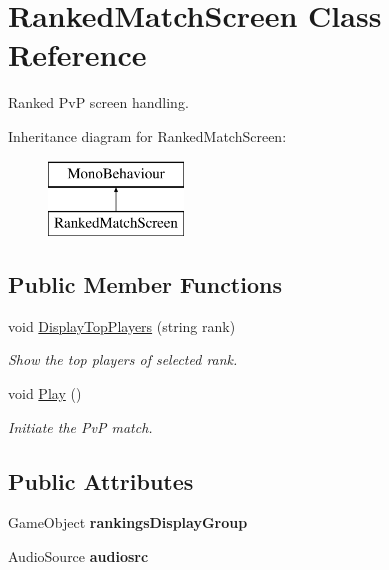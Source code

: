 \hypertarget{class_ranked_match_screen}{}\section{Ranked\+Match\+Screen Class Reference}
\label{class_ranked_match_screen}


Ranked PvP screen handling.  


Inheritance diagram for Ranked\+Match\+Screen\+:\begin{figure}[H]
\begin{center}
\leavevmode
\includegraphics[height=2.000000cm]{class_ranked_match_screen}
\end{center}
\end{figure}
\subsection*{Public Member Functions}
\begin{DoxyCompactItemize}
\item 
\mbox{\label{class_ranked_match_screen_a6ee96d8d4c47bfca292a49198e399c1b}} 
void \mbox{\hyperlink{class_ranked_match_screen_a6ee96d8d4c47bfca292a49198e399c1b}{Display\+Top\+Players}} (string rank)
\begin{DoxyCompactList}\small\item\em Show the top players of selected rank. \end{DoxyCompactList}\item 
\mbox{\label{class_ranked_match_screen_a605d6d6b0092debfa254bb43835e16c1}} 
void \mbox{\hyperlink{class_ranked_match_screen_a605d6d6b0092debfa254bb43835e16c1}{Play}} ()
\begin{DoxyCompactList}\small\item\em Initiate the PvP match. \end{DoxyCompactList}\end{DoxyCompactItemize}
\subsection*{Public Attributes}
\begin{DoxyCompactItemize}
\item 
\mbox{\label{class_ranked_match_screen_adeac07462f1e291a4f641dea869e1ff9}} 
Game\+Object {\bfseries rankings\+Display\+Group}
\item 
\mbox{\label{class_ranked_match_screen_aea358c317a97859c74904fceb35853ac}} 
Audio\+Source {\bfseries audiosrc}
\end{DoxyCompactItemize}
